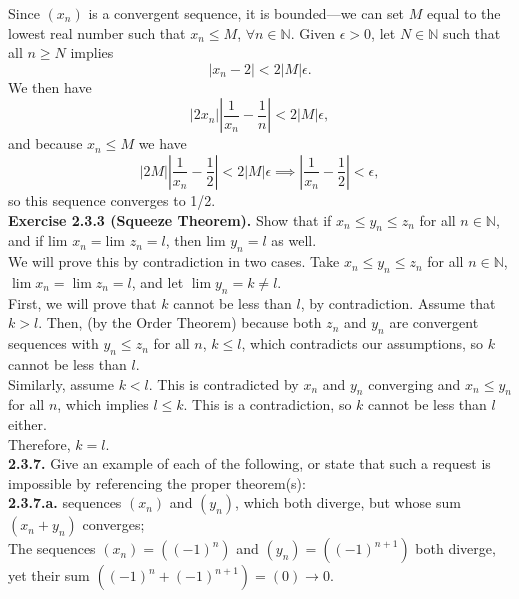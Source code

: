 \documentclass[12pt,letterpaper]{article}
\begin{document}
Since \((x_{n})\) is a convergent sequence, it is bounded---we can set \(M\) equal to the lowest real number such that \(x_{n} \leq M\), \(\forall n \in \mathbb{N}\). Given \(\epsilon > 0\), let \(N \in \mathbb{N}\) such that all \(n \geq N\) implies \[\left| x_{n} - 2\right| < 2|M|\epsilon.\] We then have \[\left|2x_{n}\right|\left| \frac{1}{x_{n}} - \frac{1}{n} \right| < 2|M|\epsilon,\] and because \(x_{n} \leq M\)  we have \[\left|2M\right| \left| \frac{1}{x_{n}} - \frac{1}{2} \right| < 2|M|\epsilon \implies \left| \frac{1}{x_{n}} - \frac{1}{2} \right| < \epsilon,\] so this sequence converges to 1/2. \\

\textbf{Exercise 2.3.3 (Squeeze Theorem).} Show that if \(x_{n} \leq y_{n} \leq z_{n} \) for all \(n \in \mathbb{N}\), and if \(\text{lim } x_{n} = \text{lim }z_{n} = l\), then \(\text{lim } y_{n} = l\) as well. \\

We will prove this by contradiction in two cases. Take \(x_{n} \leq y_{n} \leq z_{n}\) for all \(n \in \mathbb{N}\), \(\lim x_{n} = \lim z_{n} = l\), and let \(\lim y_{n} = k \neq l\). \\

First, we will prove that \(k\) cannot be less than \(l\), by contradiction. Assume that \(k > l\). Then, (by the Order Theorem) because both \(z_{n}\) and \(y_{n}\) are convergent sequences with \(y_{n} \leq z_{n}\) for all \(n\), \(k \leq l\), which contradicts our assumptions, so \(k\) cannot be less than \(l\). \\

Similarly, assume \(k < l\). This is contradicted by \(x_{n}\) and \(y_{n}\) converging and \(x_{n} \leq y_{n}\) for all \(n\), which implies \(l \leq k\). This is a contradiction, so \(k\) cannot be less than \(l\) either. \\

Therefore, \(k = l\). \\

\textbf{2.3.7.} Give an example of each of the following, or state that such a request is impossible by referencing the proper theorem(s): \\

\textbf{2.3.7.a.} sequences \((x_{n})\) and \((y_{n})\), which both diverge, but whose sum \((x_{n} + y_{n})\) converges; \\

The sequences \((x_{n}) = ((-1)^{n})\) and \((y_{n}) = ((-1)^{n+1})\) both diverge, yet their sum \(((-1)^{n} + (-1)^{n+1}) = (0) \to 0\). \\
\end{document}
